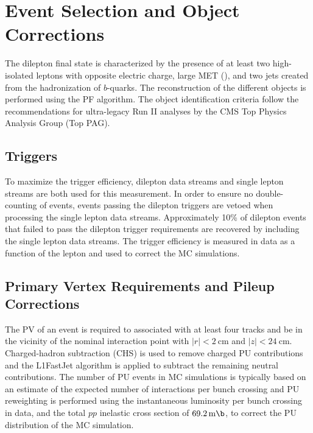 \section{Event Selection and Object Corrections}
The \ttbar dilepton final state is characterized by the presence of at least two high-\pT isolated leptons with opposite electric charge, large MET (\ETmiss), and two jets created from the hadronization of $b$-quarks.
The reconstruction of the different objects is performed using the PF algorithm.
The object identification criteria follow the recommendations for ultra-legacy Run II analyses by the CMS Top Physics Analysis Group (Top PAG).

\subsection{Triggers}
To maximize the trigger efficiency, dilepton data streams and single lepton streams are both used for this measurement.
In order to ensure no double-counting of events, events passing the dilepton triggers are vetoed when processing the single lepton data streams.
Approximately 10\% of dilepton events that failed to pass the dilepton trigger requirements are recovered by including the single lepton data streams.
The trigger efficiency is measured in data as a function of the lepton \pT and used to correct the MC simulations.

\subsection{Primary Vertex Requirements and Pileup Corrections}
The PV of an event is required to associated with at least four tracks and be in the vicinity of the nominal interaction point with $\vert r \vert < \SI{2}{\cm}$ and $\vert z \vert < \SI{24}{\cm}$. 
Charged-hadron subtraction (CHS) is used to remove charged PU contributions and the L1FastJet algorithm is applied to subtract the remaining neutral contributions.
The number of PU events in MC simulations is typically based on an estimate of the expected number of interactions per bunch crossing and PU reweighting is performed using the instantaneous luminosity per bunch crossing in data, and the total $pp$ inelastic cross section of $\SI{69.2}{\m \b}$, to correct the PU distribution of the MC simulation.


